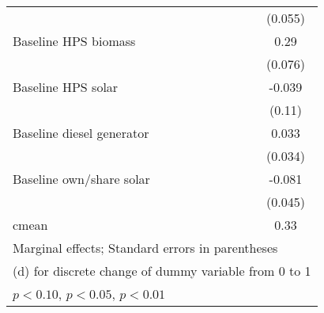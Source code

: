 \begin{table}[htbp]
\begin{tabular*}{1\hsize}{@{\hskip\tabcolsep\extracolsep\fill}l*{5}{c}}
                &                  &                  &                  &                  &  (0.055)         \\
Baseline HPS biomass&                  &                  &                  &                  &     0.29\sym{***}\\
                &                  &                  &                  &                  &  (0.076)         \\
Baseline HPS solar&                  &                  &                  &                  &   -0.039         \\
                &                  &                  &                  &                  &   (0.11)         \\
Baseline diesel generator&                  &                  &                  &                  &    0.033         \\
                &                  &                  &                  &                  &  (0.034)         \\
Baseline own/share solar&                  &                  &                  &                  &   -0.081\sym{*}  \\
                &                  &                  &                  &                  &  (0.045)         \\
\midrule
cmean           &                  &                  &                  &                  &     0.33         \\
\bottomrule
\multicolumn{6}{l}{\footnotesize Marginal effects; Standard errors in parentheses}\\
\multicolumn{6}{l}{\footnotesize  (d) for discrete change of dummy variable from 0 to 1}\\
\multicolumn{6}{l}{\footnotesize \sym{*} \(p<0.10\), \sym{**} \(p<0.05\), \sym{***} \(p<0.01\)}\\
\end{tabular*}
\end{table}
